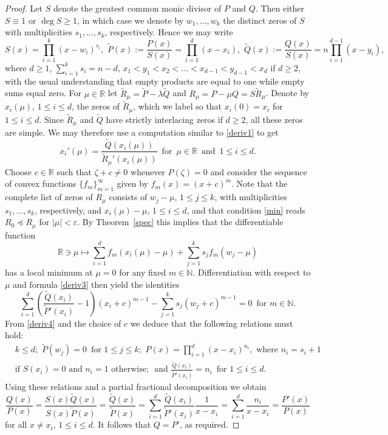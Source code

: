 \documentclass[10pt,twoside,a4paper,reqno]{amsart}
\theoremstyle{plain}
\theoremstyle{definition}
\theoremstyle{remark}
\newcommand {\bR} {\mathbb {R}}
\newcommand {\bN} {\mathbb {N}}
\newcommand {\ze} {\zeta}
\newcommand {\la} {\lambda}
\newcommand {\ve} {\varepsilon}
\begin{document}
\begin{proof}
Let $S$ denote the greatest common monic divisor of $P$ and $Q$. Then either 
$S\equiv 1$ or $\deg S\ge 1$, in which case we denote 
by $w_1,\ldots,w_k$ the distinct zeros of $S$ with multiplicities
$s_1,\ldots,s_k$, respectively. Hence we may write
$$S(x)=\prod_{i=1}^{k}(x-w_i)^{s_i},\,\,\tilde{P}(x):=\frac{P(x)}{S(x)}
=\prod_{i=1}^{d}(x-x_i),
\,\,\tilde{Q}(x):=\frac{Q(x)}{S(x)}=n\prod_{i=1}^{d-1}(x-y_i),$$
where $d\ge 1$, $\sum_{i=1}^{k}s_i=n-d$, $x_1<y_1<x_2<\ldots<x_{d-1}<
y_{d-1}<x_d$ if $d\ge 2$, with the usual understanding that empty products
are equal to one while empty sums equal zero. For $\mu\in \bR$ let 
$\tilde{R}_{\mu}=\tilde{P}-\la\tilde{Q}$ and
$R_{\mu}=P-\mu Q=S\tilde{R}_{\mu}$. Denote by $x_i(\mu)$, 
$1\le i\le d$, the zeros of $\tilde{R}_{\mu}$, which we 
label so that $x_{i}(0)=x_i$ for $1\le i\le d$. Since $\tilde{R}_{\mu}$ and 
$\tilde{Q}$ have strictly interlacing zeros if $d\ge 2$, all these zeros are 
simple. We may therefore use a computation similar to \eqref{deriv1} to get
\begin{equation}\label{deriv3}
x_{i}'(\mu)=\frac{\tilde{Q}(x_i(\mu))}{\tilde{R}_{\mu}'(x_i(\mu))}
\,\text{ for }\,\mu\in \bR\,\text{ and }\,1\le i\le d.
\end{equation}
Choose $c\in \bR$ such that 
$\ze+c\neq 0$ whenever $P(\ze)=0$ and consider the sequence of convex 
functions $\{f_m\}_{m=1}^{\infty}$ given by $f_m(x)=(x+c)^m$. Note that the 
complete list of zeros of $R_{\mu}$ consists of $w_j-\mu$, $1\le j\le k$, 
with multiplicities $s_1,\ldots,s_k$, respectively, and $x_i(\mu)-\mu$, 
$1\le i\le d$, and that condition \eqref{min} reads 
$R_0\preccurlyeq R_{\mu}$ for $|\mu|<\ve$. By Theorem~\ref{spec} this implies
that the differentiable function
$$\bR\ni \mu\mapsto \sum_{i=1}^{d}f_{m}(x_{i}(\mu)-\mu)+
\sum_{j=1}^{k}s_{j}f_{m}(w_j-\mu)$$
has a local minimum at $\mu=0$ for any fixed $m\in \bN$. Differentiation with 
respect to
\noindent
$\mu$ and formula \eqref{deriv3} then yield the identities
\begin{equation}\label{deriv4}
\sum_{i=1}^{d}\left(\frac{\tilde{Q}(x_i)}{\tilde{P}'(x_i)}-1\right)
(x_{i}+c)^{m-1}
-\sum_{j=1}^{k}s_{j}(w_{j}+c)^{m-1}=0\,\text{ for }m\in \bN.
\end{equation}
From \eqref{deriv4} and the choice of $c$ we deduce that the following 
relations must hold:
\begin{equation*}
\begin{split}
& k\le d;\,\,\tilde{P}(w_j)=0\,\text{ for }1\le j\le k;
\,\,P(x)=\prod_{i=1}^{d}(x-x_i)^{n_i},\text{ where }n_i=s_i+1\\
& \text{if }S(x_i)=0\text{ and }n_i=1\text{ otherwise};\,\text{ and }
\frac{\tilde{Q}(x_i)}{\tilde{P}'(x_i)}=n_i\,\text{ for }1\le i\le d.
\end{split}
\end{equation*}
Using these relations and a partial fractional decomposition we obtain
$$\frac{Q(x)}{P(x)}=\frac{S(x)\tilde{Q}(x)}{S(x)\tilde{P}(x)}
=\frac{\tilde{Q}(x)}{\tilde{P}(x)}=\sum_{i=1}^{d}\frac{\tilde{Q}(x_i)}
{\tilde{P}'(x_i)}\frac{1}{x-x_i}=\sum_{i=1}^{d}\frac{n_i}{x-x_i}
=\frac{P'(x)}{P(x)}$$
for all $x\neq x_i$, $1\le i\le d$. It follows that $Q=P'$, as required.
\end{proof}
\end{document}
